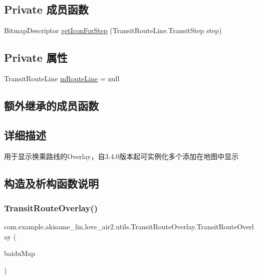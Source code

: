 \subsection*{Private 成员函数}
\begin{DoxyCompactItemize}
\item 
Bitmap\+Descriptor \mbox{\hyperlink{classcom_1_1example_1_1akisame__lin_1_1love__air2_1_1utils_1_1_transit_route_overlay_aaab0be1a9894c80259b0d97962c5f0cf}{get\+Icon\+For\+Step}} (Transit\+Route\+Line.\+Transit\+Step step)
\end{DoxyCompactItemize}
\subsection*{Private 属性}
\begin{DoxyCompactItemize}
\item 
Transit\+Route\+Line \mbox{\hyperlink{classcom_1_1example_1_1akisame__lin_1_1love__air2_1_1utils_1_1_transit_route_overlay_ab902ab9ad543922552443b9a3e09baf3}{m\+Route\+Line}} = null
\end{DoxyCompactItemize}
\subsection*{额外继承的成员函数}


\subsection{详细描述}
用于显示换乘路线的\+Overlay，自3.4.\+0版本起可实例化多个添加在地图中显示 

\subsection{构造及析构函数说明}
\mbox{\label{classcom_1_1example_1_1akisame__lin_1_1love__air2_1_1utils_1_1_transit_route_overlay_ade510d1e98c952e6f727e61fe05d5cea}} 
\subsubsection{\texorpdfstring{TransitRouteOverlay()}{TransitRouteOverlay()}}
{\footnotesize\ttfamily com.\+example.\+akisame\+\_\+lin.\+love\+\_\+air2.\+utils.\+Transit\+Route\+Overlay.\+Transit\+Route\+Overlay (\begin{DoxyParamCaption}\item[{Baidu\+Map}]{baidu\+Map }\end{DoxyParamCaption})\hspace{0.3cm}{\ttfamily [inline]}}

